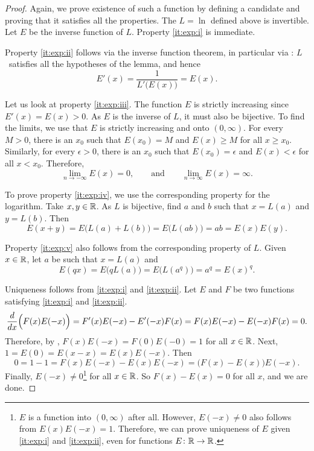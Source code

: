 \begin{proof}
Again, we prove existence of such a function by defining a candidate
and proving that it satisfies all the properties.
The $L = \ln$ defined above is invertible.  Let $E$ be the
inverse function of $L$.  Property \ref{it:exp:i} is immediate.

Property \ref{it:exp:ii} follows
via the inverse function theorem, in particular
via :  $L$~satisfies
all the hypotheses of the lemma, and hence
\begin{equation*}
E'(x) = \frac{1}{L'\bigl(E(x)\bigr)} = E(x) .
\end{equation*}

Let us look at property \ref{it:exp:iii}.
The function $E$ is strictly increasing since 
$E'(x) = E(x) > 0$.  As $E$ is the inverse of $L$, it must also
be bijective.  
To find the limits, we use that 
$E$ is strictly increasing and onto $(0,\infty)$.
For every $M > 0$, there is an $x_0$ such that
$E(x_0) = M$ and $E(x) \geq M$ for all $x \geq x_0$.
Similarly, for every $\epsilon > 0$, there is
an $x_0$ such that $E(x_0) = \epsilon$ and
$E(x) < \epsilon$ for all $x < x_0$.
Therefore,
\begin{equation*}
\lim_{n\to -\infty} E(x) = 0 , \qquad \text{and} \qquad
\lim_{n\to \infty} E(x) = \infty .
\end{equation*}

To prove property \ref{it:exp:iv}, we use the corresponding
property for the logarithm.
Take $x, y \in {\mathbb{R}}$.
As $L$ is bijective, find $a$ and $b$ such that $x = L(a)$ and $y = L(b)$.  Then
\begin{equation*}
E(x+y) =
E\bigl(L(a)+L(b)\bigr) = 
E\bigl(L(ab)\bigr) = ab = E(x)E(y)  .
\end{equation*}

Property \ref{it:exp:v} also follows from the corresponding property of $L$.
Given $x \in {\mathbb{R}}$, let $a$ be such that $x = L(a)$ and
\begin{equation*}
E(qx) = E\bigl(qL(a)\bigr)
=
E\bigl(L(a^q)\bigr) = a^q = {E(x)}^q .
\end{equation*}

Uniqueness follows from
\ref{it:exp:i} and
\ref{it:exp:ii}.
Let $E$ and $F$
be two functions satisfying
\ref{it:exp:i} and \ref{it:exp:ii}.  
\begin{equation*}
\frac{d}{dx} \Bigl( F(x)E(-x) \Bigr)
=
F'(x)E(-x) - E'(-x)F(x)
=
F(x)E(-x) - E(-x)F(x) = 0 .
\end{equation*}
Therefore, by ,
$F(x)E(-x) = F(0)E(-0) = 1$ for all $x \in {\mathbb{R}}$.
Next, $1 = E(0) = E(x-x) = E(x)E(-x)$.
Then
\begin{equation*}
0 = 1-1 = F(x)E(-x) - E(x)E(-x) = \bigl(F(x)-E(x)\bigr) E(-x) .
\end{equation*}
Finally, $E(-x) \not= 0$\footnote{%
$E$ is a function into $(0,\infty)$ after all.
However, $E(-x) \neq 0$ also follows
from $E(x)E(-x) = 1$.  Therefore, we can prove uniqueness of $E$ 
given \ref{it:exp:i} and \ref{it:exp:ii}, even for functions $E \colon {\mathbb{R}}
\to {\mathbb{R}}$.}
for all $x \in {\mathbb{R}}$.
So
$F(x)-E(x) = 0$ for all $x$, and we are done.
\end{proof}

